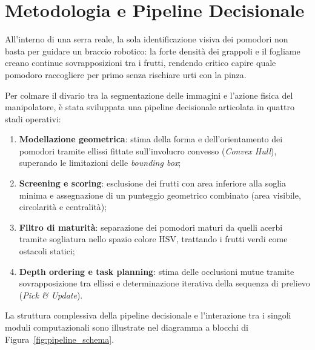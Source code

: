 \chapter{Metodologia e Pipeline Decisionale}
\label{chap:metodologia}

All'interno di una serra reale, la sola identificazione visiva dei pomodori 
non basta per guidare un braccio robotico: la forte densità dei grappoli e il 
fogliame creano continue sovrapposizioni tra i frutti, rendendo critico capire 
quale pomodoro raccogliere per primo senza rischiare urti con la pinza.

Per colmare il divario tra la segmentazione delle immagini e l'azione fisica del 
manipolatore, è stata sviluppata una pipeline decisionale articolata in quattro 
stadi operativi:
\begin{enumerate}
    \item \textbf{Modellazione geometrica}: stima della forma e dell'orientamento dei pomodori tramite ellissi fittate sull'involucro convesso (\textit{Convex Hull}), superando le limitazioni delle \textit{bounding box};
    \item \textbf{Screening e scoring}: esclusione dei frutti con area inferiore alla soglia minima e assegnazione di un punteggio geometrico combinato (area visibile, circolarità e centralità);
    \item \textbf{Filtro di maturità}: separazione dei pomodori maturi da quelli acerbi tramite sogliatura nello spazio colore HSV, trattando i frutti verdi come ostacoli statici;
    \item \textbf{Depth ordering e task planning}: stima delle occlusioni mutue tramite sovrapposizione tra ellissi e determinazione iterativa della sequenza di prelievo (\textit{Pick \& Update}).
\end{enumerate}

La struttura complessiva della pipeline decisionale e l'interazione tra i singoli moduli computazionali sono illustrate nel diagramma a blocchi di Figura~\ref{fig:pipeline_schema}.

